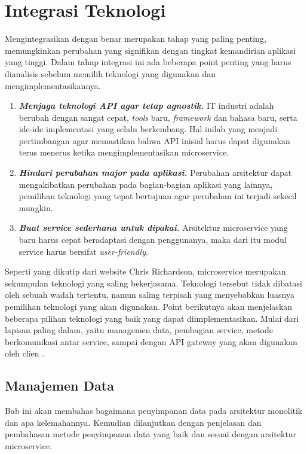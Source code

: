 \section{Integrasi Teknologi}
Mengintegrasikan dengan benar merupakan tahap yang paling penting, memungkinkan perubahan yang signifikan dengan tingkat kemandirian aplikasi yang tinggi. Dalam tahap integrasi ini ada beberapa point penting yang harus dianalisis sebelum memilih teknologi yang digunakan dan mengimplementasikannya.
\begin{enumerate}[leftmargin=*]
	\item \textit{\textbf{Menjaga teknologi API agar tetap agnostik.}} IT industri adalah berubah dengan sangat cepat, \textit{tools} baru, \textit{framework} dan bahasa baru, serta ide-ide implementasi yang selalu berkembang. Hal inilah yang menjadi pertimbangan agar memastikan bahwa API inisial harus dapat digunakan terus menerus ketika mengimplementasikan microservice.
	\item \textit{\textbf{Hindari perubahan major pada aplikasi.}} Perubahan arsitektur dapat mengakibatkan perubahan pada bagian-bagian aplikasi yang lainnya, pemilihan teknologi yang tepat bertujuan agar perubahan ini terjadi sekecil mungkin.
	\item \textit{\textbf{Buat service sederhana untuk dipakai.}} Arsitektur microservice yang baru harus cepat beradaptasi dengan penggunanya, maka dari itu modul service harus bersifat \textit{user-friendly}. 
\end{enumerate}
Seperti yang dikutip dari website Chris Richardson, microservice merupakan sekumpulan teknologi yang saling bekerjasama. Teknologi tersebut tidak dibatasi oleh sebuah wadah tertentu, namun saling terpisah yang menyebabkan luasnya pemilihan teknologi yang akan digunakan. Point berikutnya akan menjelaskan beberapa pilihan teknologi yang baik yang dapat diimplementasikan. Mulai dari lapisan paling dalam, yaitu managemen data, pembagian service, metode berkomunikasi antar service, sampai dengan API gateway yang akan digunakan oleh clien \cite{9}.
\subsection{Manajemen Data}
Bab ini akan membahas bagaimana penyimpanan data pada arsitektur monolitik dan apa kelemahannya. Kemudian dilanjutkan dengan penjelasan dan pembahasan metode penyimpanan data yang baik dan sesuai dengan arsitektur microservice.
